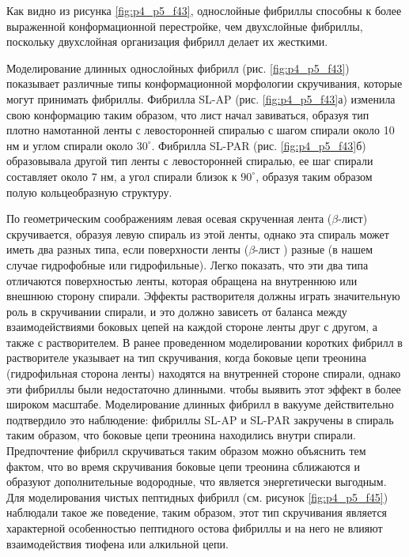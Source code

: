     Как видно из рисунка \ref{fig:p4_p5_f43}, однослойные фибриллы способны к более выраженной конформационной перестройке, чем двухслойные фибриллы, поскольку двухслойная организация фибрилл делает их жесткими.

    Моделирование длинных однослойных фибрилл (рис. \ref{fig:p4_p5_f43}) показывает различные типы конформационной морфологии скручивания, которые могут принимать фибриллы. Фибрилла SL-AP (рис. \ref{fig:p4_p5_f43}а) изменила свою конформацию таким образом, что лист начал завиваться, образуя тип плотно намотанной ленты с левосторонней спиралью с шагом спирали около 10 нм и углом спирали около $30^{\circ}$. Фибрилла SL-PAR (рис. \ref{fig:p4_p5_f43}б) образовывала другой тип ленты с левосторонней спиралью, ее шаг спирали составляет около 7 нм, а угол спирали близок к $90^{\circ}$, образуя таким образом полую кольцеобразную структуру.
    
    По геометрическим соображениям левая осевая скрученная лента ($\beta$-лист) скручивается, образуя левую спираль из этой ленты, однако эта спираль может иметь два разных типа, если поверхности ленты ($\beta$-лист ) разные (в нашем случае гидрофобные или гидрофильные). Легко показать, что эти два типа отличаются поверхностью ленты, которая обращена на внутреннюю или внешнюю сторону спирали. Эффекты растворителя должны играть значительную роль в скручивании спирали, и это должно зависеть от баланса между взаимодействиями боковых цепей на каждой стороне ленты друг с другом, а также с растворителем. В ранее проведенном моделировании коротких фибрилл в растворителе указывает на тип скручивания, когда боковые цепи треонина (гидрофильная сторона ленты) находятся на внутренней стороне спирали, однако эти фибриллы были недостаточно длинными. чтобы выявить этот эффект в более широком масштабе. Моделирование длинных фибрилл в вакууме действительно подтвердило это наблюдение: фибриллы SL-AP и SL-PAR закручены в спираль таким образом, что боковые цепи треонина находились внутри спирали. Предпочтение фибрилл скручиваться таким образом можно объяснить тем фактом, что во время скручивания боковые цепи треонина сближаются и образуют дополнительные водородные, что является энергетически выгодным. Для моделирования чистых пептидных фибрилл (см. рисунок \ref{fig:p4_p5_f45}) наблюдали такое же поведение, таким образом, этот тип скручивания является характерной особенностью пептидного остова фибриллы и на него не влияют взаимодействия тиофена или алкильной цепи.
    
